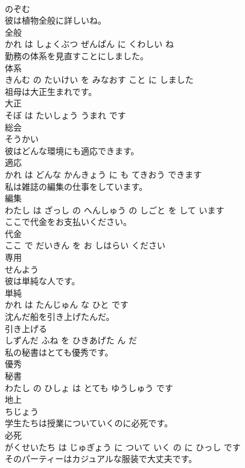 \documentclass[8pt]{extreport}
\begin{document}
\begin{CJK}{UTF8}{min}
\\	のぞむ		
\\	彼は植物全般に詳しいね。	
\\	全般 
\\	かれ は しょくぶつ ぜんぱん に くわしい ね			
\\	勤務の体系を見直すことにしました。	
\\	体系 
\\	きんむ の たいけい を みなおす こと に しました			
\\	祖母は大正生まれです。	
\\	大正 
\\	そぼ は たいしょう うまれ です			
\\	総会	
\\	そうかい		
\\	彼はどんな環境にも適応できます。	
\\	適応 
\\	かれ は どんな かんきょう に も てきおう できます			
\\	私は雑誌の編集の仕事をしています。	
\\	編集 
\\	わたし は ざっし の へんしゅう の しごと を して います			
\\	ここで代金をお支払いください。	
\\	代金 
\\	ここ で だいきん を お しはらい ください			
\\	専用	
\\	せんよう		
\\	彼は単純な人です。	
\\	単純 
\\	かれ は たんじゅん な ひと です			
\\	沈んだ船を引き上げたんだ。	
\\	引き上げる 
\\	しずんだ ふね を ひきあげた ん だ			
\\	私の秘書はとても優秀です。	
\\	優秀 
\\	秘書 
\\	わたし の ひしょ は とても ゆうしゅう です			
\\	地上	
\\	ちじょう		
\\	学生たちは授業についていくのに必死です。	
\\	必死 
\\	がくせいたち は じゅぎょう に ついて いく の に ひっし です			
\\	そのパーティーはカジュアルな服装で大丈夫です。	

\end{CJK}
\end{document}
